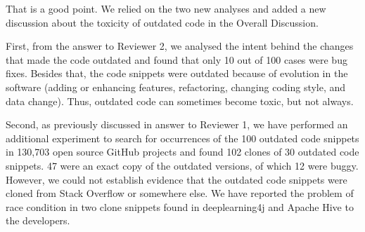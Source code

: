 \documentclass[a4paper,twoside,10pt]{reviewresponse}
\begin{document}

That is a good point. We relied on the two new analyses and added a new
discussion about the toxicity of outdated code in the Overall Discussion.

First, from the answer to Reviewer 2, we analysed the intent behind the changes
that made the code outdated and found that only 10 out of 100 cases were bug
fixes. Besides that, the code snippets were outdated because of evolution in the
software (adding or enhancing features, refactoring, changing coding style, and
data change). Thus, outdated code can sometimes become toxic, but not always.

Second, as previously discussed in answer to Reviewer 1, we have performed
an additional experiment to search for occurrences of the 100 outdated code
snippets in 130,703 open source GitHub projects and found 102 clones of 30
outdated code snippets. 47 were an exact copy of the outdated versions, of which 12
were buggy. However, we could not establish evidence that the outdated code
snippets were cloned from Stack Overflow or somewhere else. We have reported the
problem of race condition in two clone snippets found in deeplearning4j and
Apache Hive to the developers.
\end{document}
